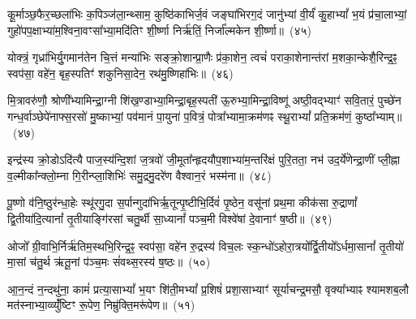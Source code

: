 {\anuvakamend[{वाजं॒ पञ्च॑विꣳशतिः}]}%

कू॒र्माञ्छ॒फैर॒च्छला॑भिः क॒पिञ्ज॑ला॒न्थ्साम॒ कुष्ठि॑काभिर्ज॒वं जङ्घा॑भिरग॒दं जानु॑भ्यां वी॒र्यं॑ कु॒हा\-भ्यां᳚ भ॒यं प्र॑चा॒लाभ्यां॒ गुहो॑पप॒क्षाभ्या॑म॒श्विना॒वꣳसा᳚भ्या॒मदि॑तिꣳ शी॒र्ष्णा निर्\mbox{}ऋ॑तिं॒ निर्जा᳚ल्मकेन शी॒र्ष्णा॥~(४५)

{\anuvakamend[{कू॒र्मान्त्रयो॑विꣳशतिः}]}%

योक्त्रं॒ गृध्रा॑भिर्यु॒गमान॑तेन चि॒त्तं मन्या॑भिः सङ्क्रो॒शान्प्रा॒णैः प्र॑का॒शेन॒ त्वचं॑ पराका॒शेनान्त॑रां म॒शका॒न्केशै॒रिन्द्र॒ꣴ॒ स्वप॑सा॒ वहे॑न॒ बृह॒स्पतिꣳ॑ शकुनिसा॒देन॒ रथ॑मु॒ष्णिहा॑भिः॥~(४६)

{\anuvakamend[{योक्त्र॒मेक॑विꣳशतिः}]}%

मि॒त्रावरु॑णौ॒ श्रोणी᳚भ्यामिन्द्रा॒ग्नी शि॑ख॒ण्डाभ्या॒मिन्द्रा॒बृह॒स्पती॑ ऊ॒रुभ्या॒मिन्द्रा॒विष्णू॑ अष्ठी॒वद्भ्याꣳ॑ सवि॒तारं॒ पुच्छे॑न गन्ध॒र्वाञ्छेपे॑नाफ्स॒रसो॑ मु॒ष्काभ्यां॒ पव॑मानं पा॒युना॑ प॒वित्रं॒ पोत्रा᳚भ्यामा॒क्रम॑णꣴ स्थू॒रा\-भ्यां᳚ प्रति॒क्रम॑णं॒ कुष्ठा᳚भ्याम्॥~(४७)

{\anuvakamend[{}]}%

इन्द्र॑स्य क्रो॒डो\-ऽदि॑त्यै पाज॒स्य॑न्दि॒शां ज॒त्रवो॑ जी॒मूता᳚न्हृदयौप॒शाभ्या॑म॒न्तरि॑क्षं पुरि॒तता॒ नभ॑ उद॒र्ये॑णेन्द्रा॒णीं प्ली॒ह्ना व॒ल्मीका᳚न्क्लो॒म्ना गि॒रीन्प्ला॒शिभिः॑ समु॒द्रमु॒दरे॑ण वैश्वान॒रं भस्म॑ना॥~(४८)

{\anuvakamend[{मि॒त्रावरु॑णा॒विन्द्र॑स्य॒ द्वाविꣳ॑शति॒र्द्वाविꣳ॑शतिः}]}%

पू॒ष्णो व॑नि॒ष्ठुर॑न्धा॒हेः स्थू॑रगु॒दा स॒र्पान्गुदा॑भिर्\mbox{}ऋ॒तून्पृ॒ष्टीभि॒र्दिवं॑ पृ॒ष्ठेन॒ वसू॑नां प्रथ॒मा कीक॑सा रु॒द्राणां᳚ द्वि॒तीया॑दि॒त्यानां᳚ तृ॒तीयाङ्गि॑रसां चतु॒र्थी सा॒ध्यानां᳚ पञ्च॒मी विश्वे॑षां दे॒वानाꣳ॑ ष॒ष्ठी॥~(४९)

{\anuvakamend[{पू॒ष्णश्चतु॑र्विꣳशतिः}]}%

ओजो᳚ ग्री॒वाभि॒र्निर्\mbox{}ऋ॑तिम॒स्थभि॒रिन्द्र॒ꣴ॒ स्वप॑सा॒ वहे॑न रु॒द्रस्य॑ विच॒लः स्क॒न्धो॑\-ऽहोरा॒त्रयो᳚र्द्वि॒तीयो᳚\-ऽर्धमा॒सानां᳚ तृ॒तीयो॑ मा॒सां च॑तु॒र्थ ऋ॑तू॒नां प॑ञ्च॒मः सं॑वथ्स॒रस्य॑ ष॒ष्ठः॥~(५०)

{\anuvakamend[{ओजो॑ विꣳश॒तिः}]}%

आ॒न॒न्दं न॒न्दथु॑ना॒ कामं॑ प्रत्या॒सा\-भ्यां᳚ भ॒यꣳ शि॑ती॒म\-भ्यां᳚ प्र॒शिषं॑ प्रशा॒साभ्याꣳ॑ सूर्याचन्द्र॒मसौ॒ वृक्या᳚भ्याꣴ श्यामशब॒लौ मत॑स्नाभ्या॒व्व्युँ॑ष्टिꣳ रू॒पेण॒ निम्रु॑क्ति॒मरू॑पेण॥~(५१)

{\anuvakamend[{आ॒न॒न्दꣳ षोड॑श}]}%

